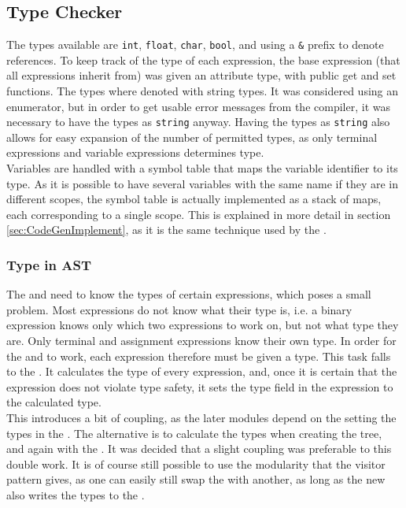 \subsection{Type Checker}
\label{typecheckImpl}

The types available are \texttt{int}, \texttt{float}, \texttt{char}, \texttt{bool},
and using a \texttt{\&} prefix to denote references. To keep track
of the type of each expression, the base expression (that all expressions inherit
from) was given an attribute type, with public get and set functions. The types
where denoted with string types. It was considered using an enumerator, but in order
to get usable error messages from the \lang{} compiler, it was necessary to have the
types as \texttt{string} anyway. Having the types as \texttt{string} also allows for easy expansion of
the number of permitted types, as only terminal expressions and variable expressions determines type.\\

Variables are handled with a symbol table that maps the variable identifier to its
type. As it is possible to have several variables with the same name if they are in
different scopes, the symbol table is actually implemented as a stack of maps, each
corresponding to  a single scope. This is explained in more detail in section
\ref{sec:CodeGenImplement}, as it is the same technique used by the \codeGen.

\subsubsection{Type in AST}

The \codeGen{} and \borrowChecker{} need to know the types of certain expressions,
which poses a small problem. Most expressions do not know what their type is, i.e. a
binary expression knows only which two expressions to work on, but not what type they
are. Only terminal and assignment expressions know their own type. In order for the
\borrowChecker{} and \codeGen{} to work, each expression therefore must be given a
type. This task falls to the \typeChecker{}. It calculates the type of every
expression, and, once it is certain that the expression does not violate type safety,
it sets the type field in the expression to the calculated type.\\

This introduces a bit of coupling, as the later modules depend on the \typeChecker{}
setting the types in the \ast. The alternative is to calculate the types when
creating the tree, and again with the \typeChecker. It was decided that a slight
coupling was preferable to this double work. It is of course still possible to use
the modularity that the visitor pattern gives, as one can easily still swap the
\typeChecker{} with another, as long as the new \typeChecker{} also writes the types
to the \ast.
